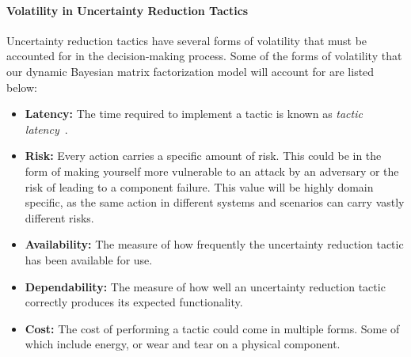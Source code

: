 \documentclass[12pt]{article}
\begin{document}

\vspace{-4mm}\paragraph{Volatility in Uncertainty Reduction Tactics}Uncertainty reduction tactics have several forms of volatility that must be accounted for in the decision-making process. Some of the forms of volatility that our dynamic Bayesian matrix factorization model will account for are listed below:

\begin{itemize}[noitemsep]
    \item \textbf{Latency: }The time required to implement a tactic is known as \emph{tactic latency}~\cite{Moreno:2018:FED:3208359.3149180,moreno2017adaptation}. %
    
    \item \textbf{Risk: }Every action carries a specific amount of risk. This could be in the form of making yourself more vulnerable to an attack by an adversary or the risk of leading to a component failure. This value will be highly domain specific,  as the same action in different systems and scenarios can carry vastly different risks.

    \item \textbf{Availability: }The measure of how frequently the uncertainty reduction tactic has been available for use.
    \item \textbf{Dependability: }The measure of how well an uncertainty reduction tactic correctly produces its expected functionality.
    \item \textbf{Cost: }The cost of performing a tactic could come in multiple forms. Some of which include energy, or wear and tear on a physical component. 
\end{itemize}
\end{document}
